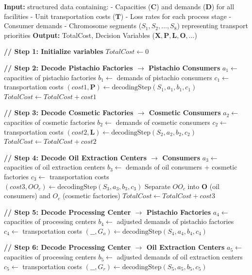 \documentclass[preprint,12pt,authoryear]{elsarticle}
\begin{document}
\begin{algorithm}
  \caption{Chromosome decoding for the supply chain (Part 1)}
  \label{algoDecode1}
  \begin{algorithmic}[1]
  \State \textbf{Input:} structured data containing:
  \State - Capacities ($\mathbf{C}$) and demands ($\mathbf{D}$) for all facilities
  \State - Unit transportation costs ($\mathbf{T}$)
  \State - Loss rates for each process stage
  \State - Consumer demands
  \State - Chromosome segments ($S_1, S_2, \ldots, S_8$) representing transport priorities
  \State \textbf{Output:} TotalCost, Decision Variables ($\mathbf{X}, \mathbf{P}, \mathbf{L}, \mathbf{O}, \dots$)
  
  \State \textbf{// Step 1: Initialize variables}
  \State $TotalCost \leftarrow 0$

  \State \textbf{// Step 2: Decode Pistachio Factories $\rightarrow$ Pistachio Consumers}
  \State $a_1 \leftarrow$ capacities of pistachio factories
  \State $b_1 \leftarrow$ demands of pistachio consumers
  \State $c_1 \leftarrow$ transportation costs
  \State $(cost1, \mathbf{P}) \leftarrow \text{decodingStep}(S_1, a_1, b_1, c_1)$
  \State $TotalCost \leftarrow TotalCost + cost1$
  
  \State \textbf{// Step 3: Decode Cosmetic Factories $\rightarrow$ Cosmetic Consumers}
  \State $a_2 \leftarrow$ capacities of cosmetic factories
  \State $b_2 \leftarrow$ demands of cosmetic consumers
  \State $c_2 \leftarrow$ transportation costs
  \State $(cost2, \mathbf{L}) \leftarrow \text{decodingStep}(S_2, a_2, b_2, c_2)$
  \State $TotalCost \leftarrow TotalCost + cost2$
  
  \State \textbf{// Step 4: Decode Oil Extraction Centers $\rightarrow$ Consumers}
  \State $a_3 \leftarrow$ capacities of oil extraction centers
  \State $b_3 \leftarrow$ demands of oil consumers + cosmetic factories
  \State $c_3 \leftarrow$ transportation costs
  \State $(cost3, OO_c) \leftarrow \text{decodingStep}(S_3, a_3, b_3, c_3)$
  \State Separate $OO_c$ into $\mathbf{O}$ (oil consumers) and $O_c$ (cosmetic factories)
  \State $TotalCost \leftarrow TotalCost + cost3$
  
  \State \textbf{// Step 5: Decode Processing Center $\rightarrow$ Pistachio Factories}
  \State $a_4 \leftarrow$ capacities of processing centers
  \State $b_4 \leftarrow$ adjusted demands of pistachio factories
  \State $c_4 \leftarrow$ transportation costs
  \State $(\_\_, G_o) \leftarrow \text{decodingStep}(S_4, a_4, b_4, c_4)$
  
  \State \textbf{// Step 6: Decode Processing Center $\rightarrow$ Oil Extraction Centers}
  \State $a_5 \leftarrow$ capacities of processing centers
  \State $b_5 \leftarrow$ adjusted demands of oil extraction centers
  \State $c_5 \leftarrow$ transportation costs
  \State $(\_\_, G_r) \leftarrow \text{decodingStep}(S_5, a_5, b_5, c_5)$
  \EndProcedure
  \end{algorithmic}
\end{algorithm}
\end{document}
